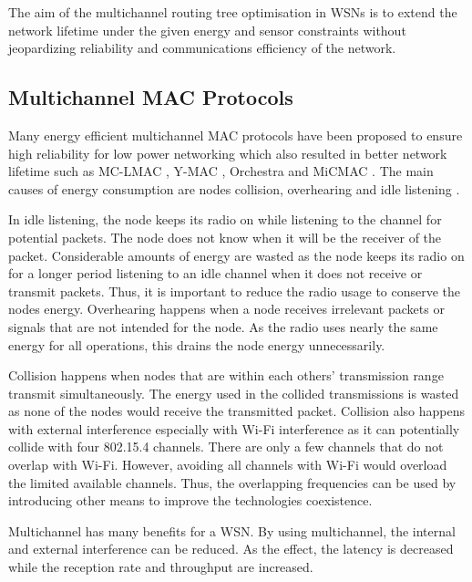 The aim of the multichannel routing tree optimisation in WSNs is to extend the network lifetime under the given energy and sensor constraints without jeopardizing reliability and communications efficiency of the network.

\subsection{Multichannel MAC Protocols}
Many energy efficient multichannel MAC protocols have been proposed to ensure high reliability for low power networking which also resulted in better network lifetime such as MC-LMAC \cite{mc-lmac}, Y-MAC \cite{y-mac}, Orchestra \cite{orchestra} and MiCMAC \cite{micmac}.  
The main causes of energy consumption are nodes collision, overhearing and idle listening \cite{macsurvey}.

In idle listening, the node keeps its radio on while listening to the channel for potential packets. The node does not know when it will be the receiver of the packet. Considerable amounts of energy are wasted as the node keeps its radio on for a longer period listening to an idle channel when it does not receive or transmit packets. Thus, it is important to reduce the radio usage to conserve the nodes energy. Overhearing happens when a node receives irrelevant packets or signals that are not intended for the node. As the radio uses nearly the same energy for all operations, this drains the node energy unnecessarily. 

Collision happens when nodes that are within each others' transmission range transmit simultaneously. The energy used in the collided transmissions is wasted as none of the nodes would receive the transmitted packet. 
Collision also happens with external interference especially with Wi-Fi interference as it can potentially collide with four 802.15.4 channels. There are only a few channels that do not overlap with Wi-Fi. However, avoiding all channels with Wi-Fi would overload the limited available channels. Thus, the overlapping frequencies can be used by introducing other means to improve the technologies coexistence.

Multichannel has many benefits for a WSN. By using multichannel, the internal and external interference can be reduced. As the effect, the latency is decreased while the reception rate and throughput are increased.

